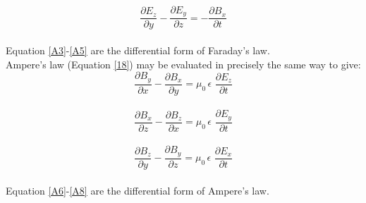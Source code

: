 \documentclass[12pt]{article}
\numberwithin{equation}{section}
\begin{document}
\begin{equation}
    \frac{\partial{E_z}}{\partial{y}}-\frac{\partial{E_y}}{\partial{z}}=-\frac{\partial{B_x}}{\partial{t}}\label{A5}
\end{equation}
\\
Equation \eqref{A3}-\eqref{A5} are the differential form of Faraday's law.\\
\newpage
\indent Ampere's law (Equation \eqref{18}) may be evaluated in precisely the same way to give:
\begin{equation}
    \frac{\partial{B_y}}{\partial{x}}-\frac{\partial{B_x}}{\partial{y}}=\mu_0\,\epsilon\,\,\frac{\partial{E_z}}{\partial{t}}\label{A6}
\end{equation}
\\
\begin{equation}
    \frac{\partial{B_x}}{\partial{z}}-\frac{\partial{B_z}}{\partial{x}}=\mu_0\,\epsilon\,\,\frac{\partial{E_y}}{\partial{t}}\label{A7}
\end{equation}
\\
\begin{equation}
    \frac{\partial{B_z}}{\partial{y}}-\frac{\partial{B_y}}{\partial{z}}=\mu_0\,\epsilon\,\,\frac{\partial{E_x}}{\partial{t}}\label{A8}
\end{equation}
\\
Equation \eqref{A6}-\eqref{A8} are the differential form of Ampere's law.
\newpage
\end{document}
